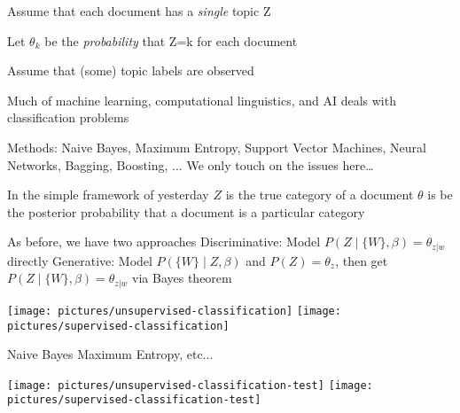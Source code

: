 \documentclass{mediumfoils}
\begin{document}

Assume that each document has a \textit{single} topic Z

Let $\theta_k$ be the \textit{probability} that Z=k for each document

Assume that (some) topic labels are observed








Much of machine learning, computational linguistics, and AI deals with classification problems

Methods: 
\ita
\itm Naive Bayes, Maximum Entropy, Support Vector Machines, Neural Networks, Bagging, Boosting, $\ldots$
\itm We only touch on the issues here\ldots
\itz 


In the simple framework of yesterday 
\ita
\itm $Z$ is the true category of a document 
\itm $\theta$ is be the posterior probability that a document is a particular category
\itz


As before, we have two approaches
\ita
\itm Discriminative: Model $P(Z \mid \{W\}, \beta) = \theta_{z|w}$ directly
\itm Generative: Model $P(\{W\} \mid Z, \beta)$ and $P(Z)=\theta_z$, then get $P(Z \mid \{W\}, \beta) = \theta_{z|w}$ via Bayes theorem
\itz


\centerline{\texttt{[image: pictures/unsupervised-classification]} \hfill \texttt{[image: pictures/supervised-classification]}}

Naive Bayes \hfill Maximum Entropy, etc...

\vfill 


\centerline{\texttt{[image: pictures/unsupervised-classification-test]} \hfill \texttt{[image: pictures/supervised-classification-test]}}
\end{document}
